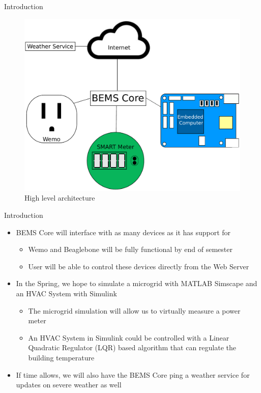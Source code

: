 \documentclass{beamer}
\begin{document}
\begin{frame}{Introduction}{}
    \begin{figure}
        \centering
        \includegraphics[scale=0.4]{figs/highLevelArchitecture.pdf}
        \caption{High level architecture}
        \label{fig:my_label}
    \end{figure}
\end{frame}

\begin{frame}{Introduction}{}
    \begin{itemize}
        \item BEMS Core will interface with as many devices as it has support for 
        \begin{itemize}
            \item Wemo and Beaglebone will be fully functional by end of semester
            \item User will be able to control these devices directly from the Web Server
        \end{itemize}
        \item In the Spring, we hope to simulate a microgrid with MATLAB Simscape and an HVAC System with Simulink
        \begin{itemize}
            \item The microgrid simulation will allow us to virtually measure a power meter
            \item An HVAC System in Simulink could be controlled with a Linear Quadratic Regulator (LQR) based algorithm that can regulate the building temperature
        \end{itemize}
        \item If time allows, we will also have the BEMS Core ping a weather service for updates on severe weather as well
    \end{itemize}
\end{frame}
\end{document}

